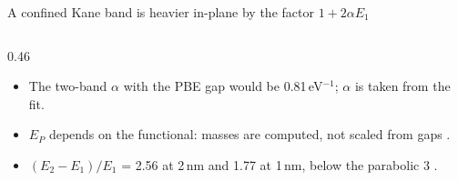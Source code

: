 \begin{frame}{A confined Kane band is heavier in-plane by the factor $1+2\alpha E_1$}
\begin{columns}[T,onlytextwidth]
\begin{column}{0.46\textwidth}
\begin{itemize}
          .
        \item The two-band $\alpha$ with the PBE gap would be 0.81\,eV$^{-1}$; $\alpha$ is taken from the fit.
        \item $E_P$ depends on the functional: masses are computed, not scaled from gaps .
        \item $(E_2 - E_1)/E_1$ = 2.56 at 2\,nm and 1.77 at 1\,nm, below the parabolic 3 .
      \end{itemize}
    \end{column}
  \end{columns}
\end{frame}

